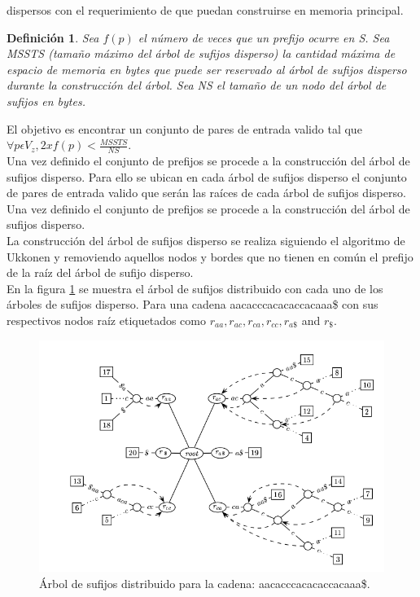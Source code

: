 \documentclass[12pt,a4paper]{article}
\newtheorem{mydef}{Definición}
\begin{document}
dispersos con el requerimiento de que puedan construirse en memoria principal.
\begin{mydef}
Sea $f(p)$ el número de veces que un prefijo ocurre en S. Sea MSSTS (tamaño máximo del árbol de sufijos disperso) la cantidad
máxima de espacio de memoria en bytes que puede ser reservado al árbol de sufijos disperso durante la construcción del árbol. 
Sea NS el tamaño de un nodo del árbol de sufijos en bytes.
\end{mydef}
El objetivo es encontrar un conjunto de pares de entrada valido tal que $\forall p \epsilon V_{z}, 2xf(p)<\frac{MSSTS}{NS}$.\\
Una vez definido el conjunto de prefijos se procede a la construcción del árbol de sufijos disperso. Para ello se ubican en cada
árbol de sufijos disperso el conjunto de pares de entrada valido que serán las raíces de cada árbol de sufijos disperso. Una vez 
definido el conjunto de prefijos se procede a la construcción del árbol de sufijos disperso.\\
La construcción del árbol de sufijos disperso se realiza siguiendo el algoritmo de Ukkonen y removiendo aquellos nodos y bordes
que no tienen en común el prefijo de la raíz del árbol de sufijo disperso.\\
En la figura \ref{fig:dst} se muestra el árbol de sufijos distribuido con cada uno de los árboles de sufijos disperso. Para una
cadena aacacccacacaccacaaa\$ con sus respectivos nodos raíz etiquetados como $r_{aa}, r_{ac}, r_{ca}, r_{cc}, r_{a\$}$ and $r_{\$}$.
\begin{figure}[h]
\begin{center}
\includegraphics[scale=0.4]{dst2.png}
\caption{Árbol de sufijos distribuido para la cadena: aacacccacacaccacaaa\$.}
\label{fig:dst}
\end{center}
\end{figure}
\end{document}
